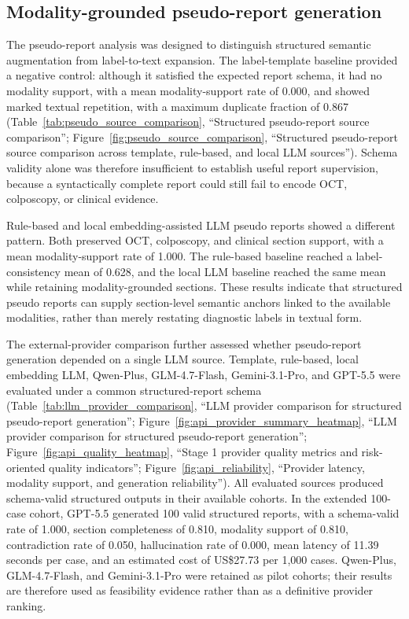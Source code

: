 \subsection{Modality-grounded pseudo-report generation}
\label{subsec:pseudo_report_results}

The pseudo-report analysis was designed to distinguish structured semantic augmentation from label-to-text expansion. The label-template baseline provided a negative control: although it satisfied the expected report schema, it had no modality support, with a mean modality-support rate of 0.000, and showed marked textual repetition, with a maximum duplicate fraction of 0.867 (Table~\ref{tab:pseudo_source_comparison}, ``Structured pseudo-report source comparison''; Figure~\ref{fig:pseudo_source_comparison}, ``Structured pseudo-report source comparison across template, rule-based, and local LLM sources''). Schema validity alone was therefore insufficient to establish useful report supervision, because a syntactically complete report could still fail to encode OCT, colposcopy, or clinical evidence.

Rule-based and local embedding-assisted LLM pseudo reports showed a different pattern. Both preserved OCT, colposcopy, and clinical section support, with a mean modality-support rate of 1.000. The rule-based baseline reached a label-consistency mean of 0.628, and the local LLM baseline reached the same mean while retaining modality-grounded sections. These results indicate that structured pseudo reports can supply section-level semantic anchors linked to the available modalities, rather than merely restating diagnostic labels in textual form.

The external-provider comparison further assessed whether pseudo-report generation depended on a single LLM source. Template, rule-based, local embedding LLM, Qwen-Plus, GLM-4.7-Flash, Gemini-3.1-Pro, and GPT-5.5 were evaluated under a common structured-report schema (Table~\ref{tab:llm_provider_comparison}, ``LLM provider comparison for structured pseudo-report generation''; Figure~\ref{fig:api_provider_summary_heatmap}, ``LLM provider comparison for structured pseudo-report generation''; Figure~\ref{fig:api_quality_heatmap}, ``Stage 1 provider quality metrics and risk-oriented quality indicators''; Figure~\ref{fig:api_reliability}, ``Provider latency, modality support, and generation reliability''). All evaluated sources produced schema-valid structured outputs in their available cohorts. In the extended 100-case cohort, GPT-5.5 generated 100 valid structured reports, with a schema-valid rate of 1.000, section completeness of 0.810, modality support of 0.810, contradiction rate of 0.050, hallucination rate of 0.000, mean latency of 11.39 seconds per case, and an estimated cost of US\$27.73 per 1,000 cases. Qwen-Plus, GLM-4.7-Flash, and Gemini-3.1-Pro were retained as pilot cohorts; their results are therefore used as feasibility evidence rather than as a definitive provider ranking.


